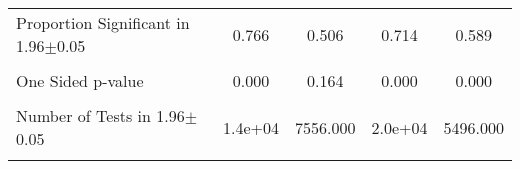 {\begin{tabular}{l*{4}{c}}
                &                  &                  &                  &                  \\
\hline Proportion Significant in 1.96$\pm$0.05&    0.766         &    0.506         &    0.714         &    0.589         \\
                &                  &                  &                  &                  \\
One Sided p-value&    0.000         &    0.164         &    0.000         &    0.000         \\
                &                  &                  &                  &                  \\
Number of Tests in 1.96$\pm$0.05&  1.4e+04         & 7556.000         &  2.0e+04         & 5496.000         \\
                &                  &                  &                  &                  \\
\hline\hline
\end{tabular}
}

